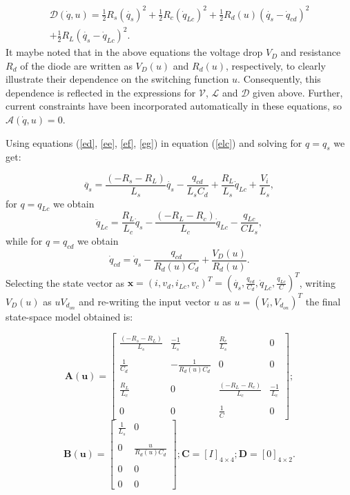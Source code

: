 \documentclass[preprint,12pt]{elsarticle}
\begin{document}
 \begin{multline}  \label{eg}
\mathcal{D}(\dot{q},u)=\frac{1}{2} R_{s}\left(\dot{q_{s}}\right)^{2}+\frac{1}{2} R_{c}\left(\dot{q}_{Lc}\right)^{2}+\frac{1}{2} R_{d}(u)\left(\dot{q_{s}}-\dot{q}_{cd}\right)^{2} \\
+\frac{1}{2} R_{L}\left(\dot{q_{s}}-\dot{q}_{Lc}\right)^{2}.
\end{multline}
It maybe noted that in the above equations the voltage drop $V_D$ and resistance $R_d$ of the diode are written as $V_D(u)$  and $R_d(u)$, respectively, to clearly illustrate their dependence on the switching function $u$. Consequently, this dependence is reflected in the expressions for $\mathcal{V}$, $\mathcal{L}$ and $\mathcal{D}$ given above. Further, current constraints have been incorporated automatically in these equations, so $\mathcal{A}(\dot{q},u)=0$.

Using equations (\ref{ed}, \ref{ee}, \ref{ef}, \ref{eg}) in equation (\ref{elc}) and solving for $q=q_{s}$ we get:

  $$
 \ddot{q_{s}}=\frac{(-R_{s}-R_{L})}{L_{s}}\dot{q_{s}}-\frac{q_{cd}}{L_sC_d}+\frac{R_{L}}{L_{s}}\dot{q}_{Lc}+\frac{V_{i}}{L_{s}},
  $$
  for $q=q_{Lc}$ we obtain
  $$
 \ddot{q}_{Lc}=\frac{R_{L}}{L_{c}}\dot{q}_{s}-\frac{(-R_{L}-R_{c})}{L_{c}}\dot{q}_{Lc}-\frac{q_{Lc}}{CL_{s}},
  $$
  while for $q=q_{cd}$ we obtain
  $$
 \dot{q}_{cd}=\dot{q}_{s}-\frac{q_{cd}}{R_{d}(u)C_{d}}+\frac{V_{D}(u)}{R_{d}(u)}.
  $$
  Selecting the state vector as $\mathbf{x}=\left( i,v_{d},i_{Lc},v_{c} \right)^{T}= \left( \dot{q_{s}},\frac{{q}_{cd}}{C_{d}},\dot{q}_{Lc},\frac{q_{Lc}}{C} \right)^{T}$, writing $V_D(u)$ as $uV_{d_{on}}$ and re-writing the input vector $u$ as $u=\left( V_{i},V_{d_{on}}\right)^{T}$  the final state-space model obtained is:


  $$
\mathbf{A(u)}=\begin{bmatrix}
\frac{\left(-R_{s}-R_{L}\right)}{L_{s}} & \frac{-1}{L_{s}} &\frac{R_{c}}{L_{s}}&0\\ \\ \frac{1}{C_{d}} & -\frac{1}{R_{d}(u)C_{d}} &0&0 \\ \\
\frac{R_{L}}{L_{c}}&0 &\frac{\left(-R_{L}-R_{c}\right)}{L_{c}}&\frac{-1}{L_{c}}\\ \\ 0&0 &\frac{1}{C}&0\end{bmatrix} ;
$$  
$$
\mathbf{B(u)}=\begin{bmatrix}
\frac{1}{L_{s}}&0\\ \\  0&\frac{u}{R_{d}(u)C_{d}} \\ \\  0&0
\\ \\  0&0\end{bmatrix};\mathbf{C}=\left[I\right]_{4\times 4} ;\mathbf{D}=\left[0\right]_{4\times 2}.
$$ 
\end{document}

